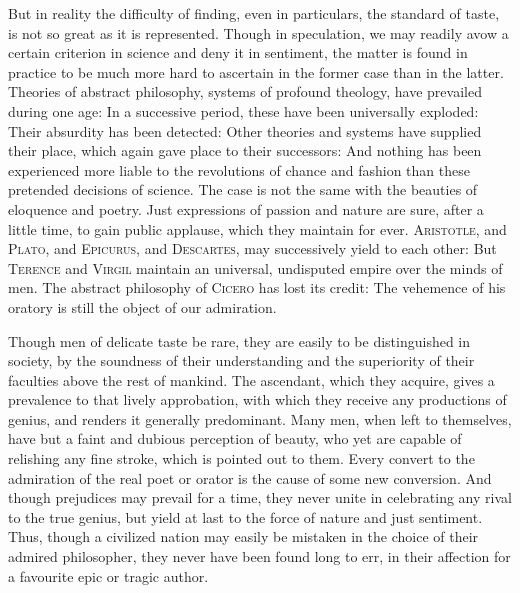 But in reality the difficulty of finding, even in particulars, the
standard of taste, is not so great as it is represented. Though in
speculation, we may readily avow a certain criterion in science and
deny it in sentiment, the matter is found in practice to be much more
hard to ascertain in the former case than in the latter. Theories of
abstract philosophy, systems of profound theology, have prevailed
during one age: In a successive period, these have been universally
exploded: Their absurdity has been detected: Other theories and
systems have supplied their place, which again gave place to their
successors: And nothing has been experienced more liable to the
revolutions of chance and fashion than these pretended decisions of
science. The case is not the same with the beauties of eloquence and
poetry. Just expressions of passion and nature are sure, after a
little time, to gain  public applause, which they maintain
for ever. \textsc{Aristotle}, and \textsc{Plato}, and
\textsc{Epicurus}, and \textsc{Descartes}, may successively yield to
each other: But \textsc{Terence} and \textsc{Virgil} maintain an
universal, undisputed empire over the minds of men. The abstract
philosophy of \textsc{Cicero} has lost its credit: The vehemence of
his oratory is still the object of our admiration.

Though men of delicate taste be rare, they are easily to be
distinguished in society, by the soundness of their understanding and
the superiority of their faculties above the rest of mankind. The
ascendant, which they acquire, gives a prevalence to that lively
approbation, with which they receive any productions of genius, and
renders it generally predominant. Many men, when left to themselves,
have but a faint and dubious perception of beauty, who yet are capable
of relishing any fine stroke, which is pointed out to them. Every
convert to the admiration of the real poet or orator is the cause of
some new conversion. And though prejudices may prevail for a time,
they never unite in celebrating any rival to the true genius, but
yield at last to the force of nature and just sentiment. Thus, though
a civilized nation may easily be mistaken in the choice of their
admired philosopher, they never have been found long to err, in their
affection for a favourite epic or tragic author.

